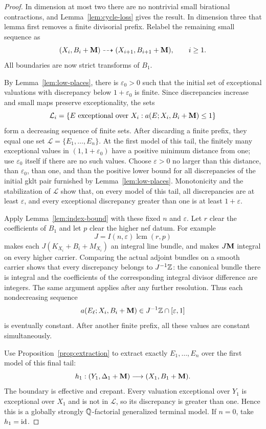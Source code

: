 \begin{proof}
In dimension at most two there are no nontrivial small birational
contractions, and Lemma~\ref{lem:cycle-loss} gives the result.  In dimension
three that lemma first removes a finite divisorial prefix.  Relabel the
remaining small sequence as
\[
 (X_i,B_i+\mathbf M)\dashrightarrow(X_{i+1},B_{i+1}+\mathbf M),\qquad i\geq1.
\]
All boundaries are now strict transforms of $B_1$.

By Lemma~\ref{lem:low-places}, there is $\varepsilon_0>0$ such that the
initial set of exceptional valuations with discrepancy below
$1+\varepsilon_0$ is finite.  Since discrepancies increase and small maps
preserve exceptionality, the sets
\[
 \mathcal L_i=\{E\text{ exceptional over }X_i:
                       a(E;X_i,B_i+\mathbf M)\leq1\}
\]
form a decreasing sequence of finite sets.  After discarding a finite
prefix, they equal one set $\mathcal L=\{E_1,\ldots,E_n\}$.
At the first model of this tail, the finitely many exceptional values in
$(1,1+\varepsilon_0)$ have a positive minimum distance from one; use
$\varepsilon_0$ itself if there are no such values.  Choose
$\varepsilon>0$ no larger than this distance, than $\varepsilon_0$, than
one, and than the positive lower bound for all discrepancies of the initial
gklt pair furnished by Lemma~\ref{lem:low-places}.  Monotonicity and the
stabilization of $\mathcal L$ show that, on every model of this tail,
all discrepancies are at least $\varepsilon$, and every exceptional
discrepancy greater than one is at least $1+\varepsilon$.

Apply Lemma~\ref{lem:index-bound} with these fixed $n$ and
$\varepsilon$.  Let $r$ clear the coefficients of $B_1$ and let $p$ clear
the higher nef datum.  For example
\[
 J=I(n,\varepsilon)\operatorname{lcm}(r,p)
\]
makes each $J(K_{X_i}+B_i+M_{X_i})$ an integral line bundle, and makes
$J\mathbf M$ integral on every higher carrier.  Comparing the actual adjoint
bundles on a smooth carrier shows that every discrepancy belongs to
$J^{-1}\mathbb Z$: the canonical bundle there is integral and the coefficients
of the corresponding integral divisor difference are integers.  The same
argument applies after any further resolution.  Thus each nondecreasing
sequence
\[
 a(E_\ell;X_i,B_i+\mathbf M)\in J^{-1}\mathbb Z\cap[\varepsilon,1]
\]
is eventually constant.  After another finite prefix, all these values
are constant simultaneously.

Use Proposition~\ref{prop:extraction} to extract exactly
$E_1,\ldots,E_n$ over the first model of this final tail:
\[
 h_1:(Y_1,\Delta_1+\mathbf M)\longrightarrow(X_1,B_1+\mathbf M).
\]
The boundary is effective and crepant.  Every valuation exceptional over
$Y_1$ is exceptional over $X_1$ and is not in $\mathcal L$, so its
discrepancy is greater than one.  Hence this is a globally strongly
$\mathbb Q$-factorial generalized terminal model.  If $n=0$, take $h_1=\mathrm{id}$.


\end{proof}

